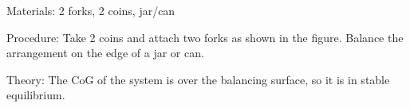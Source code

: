 \begin{multicols}{2}
\begin{description*}
\item[Materials:]{2 forks, 2 coins, jar/can}
\item[Procedure:]{Take 2 coins and attach two forks as shown in the figure. Balance the arrangement on the edge of a jar or can.}
\item[Theory:]{The CoG of the system is over the balancing surface, so it is in stable equilibrium.}
\end{description*}





\end{multicols}

\pagebreak